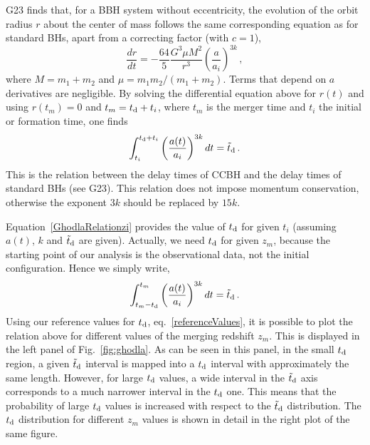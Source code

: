 \documentclass[fleqn,usenatbib,useAMS]{mnras}
\begin{document}
G23 finds that, for a BBH system without eccentricity, the evolution of the orbit radius $r$ about the center of mass follows the same corresponding equation as for standard BHs, apart from a correcting factor (with $c=1$),
\begin{equation}
    \frac{dr}{dt} = - \frac{64}{5} \frac{G^3\mu M^2}{r^3} \left(\frac{a}{a_i}\right)^{3k} \, ,
\end{equation}
 where $M = m_1 + m_2$ and $\mu = m_1 m_2/(m_1 + m_2)$. Terms that depend on $a$  derivatives are negligible. By solving the differential equation above for $r(t)$ and using $r(t_m)=0$ and $t_m = t_{\rm d} + t_i$,  where $t_m$ is the merger time and $t_i$ the initial or formation time, one finds
 \begin{equation}
     \int^{t_{\rm d} + t_i}_{t_i} \left(\frac{a(t)}{a_i}\right)^{3k} dt = \tilde t_{\rm d} \, . \label{GhodlaRelationzi}
 \end{equation}
This  is the relation between the delay times of CCBH and the delay times of standard BHs (see G23). 
This relation does not impose momentum conservation, otherwise the exponent $3 k$ should be replaced by $15 k$.

Equation~\eqref{GhodlaRelationzi} provides the value of $t_{\rm d}$ for given $t_{i}$ (assuming $a(t)$, $k$ and $\tilde t_{\rm d}$ are given). Actually, we need  $t_{\rm d}$ for given $z_m$, because the starting point of our analysis is the observational data, not the initial configuration. Hence we simply write, 
\begin{equation}
     \int^{t_m}_{t_m - t_{\rm d}} \left(\frac{a(t)}{a_i}\right)^{3k} dt = \tilde t_{\rm d} \, . \label{GhodlaRelationzm}
 \end{equation}
Using our reference values for $t_{\rm d}$, eq.~\eqref{referenceValues},  it is possible to plot the relation above for different values of the merging redshift $z_m$. This is displayed in the left panel of Fig.~\ref{fig:ghodla}. As can be seen in this panel, in the small $t_{\rm d}$ region, a given $\tilde t_{\rm d}$ interval is mapped into a $t_{\rm d}$  interval  with approximately the same length. However, for large $t_{\rm d}$ values, a wide interval in the $\tilde  t_{\rm d}$ axis corresponds to a much narrower interval in the $t_{\rm d}$ one. This means that the probability of large $t_{\rm d}$ values is increased with respect to the $\tilde t_{\rm d}$ distribution. The $t_{\rm d}$ distribution for different $z_m$ values is shown in detail in the right plot of the same figure.
\end{document}
